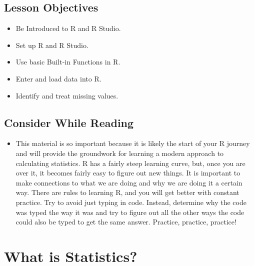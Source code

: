 \documentclass[
  letterpaper,
  DIV=11,
  numbers=noendperiod]{scrreprt}
\providecommand{\tightlist}{%
  \setlength{\itemsep}{0pt}\setlength{\parskip}{0pt}}\usepackage{longtable,booktabs,array}
\begin{document}
\section{Lesson Objectives}\label{lesson-objectives}

\begin{itemize}
\tightlist
\item
  Be Introduced to R and R Studio.
\item
  Set up R and R Studio.
\item
  Use basic Built-in Functions in R.
\item
  Enter and load data into R.
\item
  Identify and treat missing values.
\end{itemize}

\section{Consider While Reading}\label{consider-while-reading}

\begin{itemize}
\tightlist
\item
  This material is so important because it is likely the start of your R
  journey and will provide the groundwork for learning a modern approach
  to calculating statistics. R has a fairly steep learning curve, but,
  once you are over it, it becomes fairly easy to figure out new things.
  It is important to make connections to what we are doing and why we
  are doing it a certain way. There are rules to learning R, and you
  will get better with constant practice. Try to avoid just typing in
  code. Instead, determine why the code was typed the way it was and try
  to figure out all the other ways the code could also be typed to get
  the same answer. Practice, practice, practice!
\end{itemize}


\chapter{What is Statistics?}\label{what-is-statistics}
\end{document}

